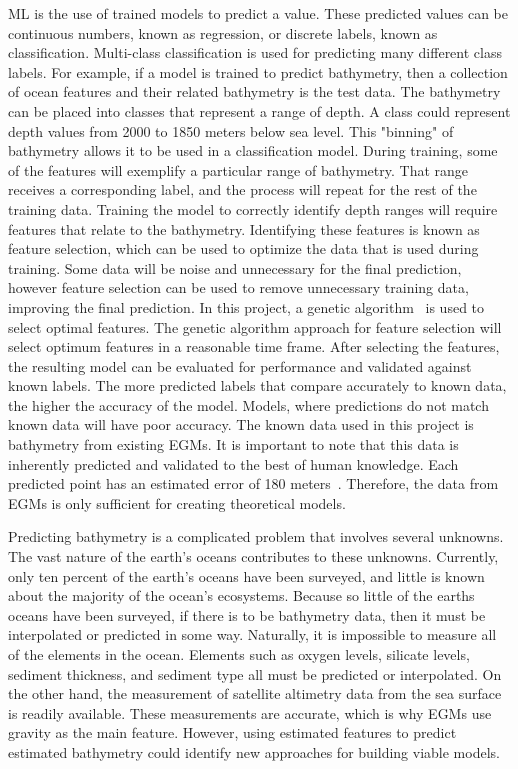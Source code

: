 \par
\ac{ML} is the use of trained models to predict a value.
These predicted values can be continuous numbers, known as regression, or discrete labels, known as classification.
Multi-class classification is used for predicting many different class labels.
For example, if a model is trained to predict bathymetry, then a collection of ocean features and their related bathymetry is the test data.
The bathymetry can be placed into classes that represent a range of depth.
A class could represent depth values from 2000 to 1850 meters below sea level.
This "binning" of bathymetry allows it to be used in a classification model.
During training, some of the features will exemplify a particular range of bathymetry.
That range receives a corresponding label, and the process will repeat for the rest of the training data.
Training the model to correctly identify depth ranges will require features that relate to the bathymetry.
Identifying these features is known as feature selection, which can be used to optimize the data that is used during training.
Some data will be noise and unnecessary for the final prediction, however feature selection can be used to remove unnecessary training data, improving the final prediction.
In this project, a genetic algorithm~\cite{yang1998feature} is used to select optimal features.
The genetic algorithm approach for feature selection will select optimum features in a reasonable time frame.
After selecting the features, the resulting model can be evaluated for performance and validated against known labels.
The more predicted labels that compare accurately to known data, the higher the accuracy of the model.
Models, where predictions do not match known data will have poor accuracy.
The known data used in this project is bathymetry from existing \ac{EGM}s.
It is important to note that this data is inherently predicted and validated to the best of human knowledge.
Each predicted point has an estimated error of 180 meters~\cite{becker2009global}.
Therefore, the data from \ac{EGM}s is only sufficient for creating theoretical models.

\par
Predicting bathymetry is a complicated problem that involves several unknowns.
The vast nature of the earth's oceans contributes to these unknowns.
Currently, only ten percent of the earth's oceans have been surveyed, and little is known about the majority of the ocean's ecosystems.
Because so little of the earths oceans have been surveyed, if there is to be bathymetry data, then it must be interpolated or predicted in some way.
Naturally, it is impossible to measure all of the elements in the ocean.
Elements such as oxygen levels, silicate levels, sediment thickness, and sediment type all must be predicted or interpolated.
On the other hand, the measurement of satellite altimetry data from the sea surface is readily available.
These measurements are accurate, which is why \ac{EGM}s use gravity as the main feature.
However, using estimated features to predict estimated bathymetry could identify new approaches for building viable models.

